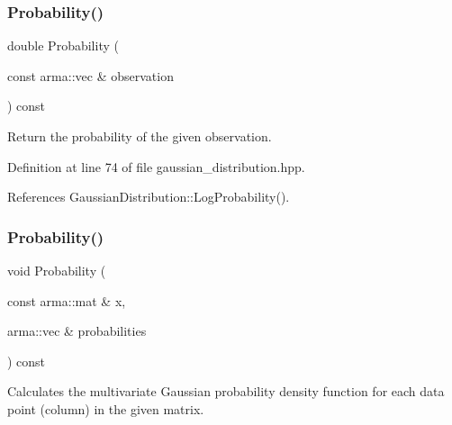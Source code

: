 \mbox{\label{classmlpack_1_1distribution_1_1GaussianDistribution_ab72935d592516e77511d0b5e703c0d41}} 
\subsubsection{Probability()\hspace{0.1cm}{\footnotesize\ttfamily [1/2]}}
{\footnotesize\ttfamily double Probability (\begin{DoxyParamCaption}\item[{const arma\+::vec \&}]{observation }\end{DoxyParamCaption}) const\hspace{0.3cm}{\ttfamily [inline]}}



Return the probability of the given observation. 



Definition at line 74 of file gaussian\+\_\+distribution.\+hpp.



References Gaussian\+Distribution\+::\+Log\+Probability().

\mbox{\label{classmlpack_1_1distribution_1_1GaussianDistribution_a1e516aca34e9c99caf1431a822d87fc6}} 
\subsubsection{Probability()\hspace{0.1cm}{\footnotesize\ttfamily [2/2]}}
{\footnotesize\ttfamily void Probability (\begin{DoxyParamCaption}\item[{const arma\+::mat \&}]{x,  }\item[{arma\+::vec \&}]{probabilities }\end{DoxyParamCaption}) const\hspace{0.3cm}{\ttfamily [inline]}}



Calculates the multivariate Gaussian probability density function for each data point (column) in the given matrix. 


